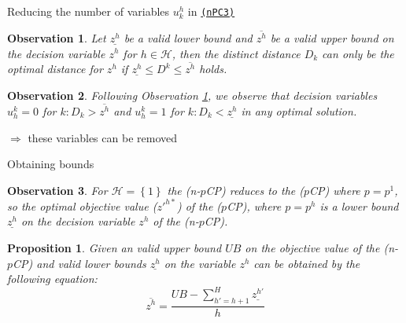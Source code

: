 \documentclass[utf8,aspectratio=1610,ngerman,english]{beamer}
\newtheorem{observation}{Observation}
\newtheorem{proposition}{Proposition}
\newcommand{\nPCE}{\hyperref[eq:nPCE]{\texttt{(nPC3)}}\xspace}
\newcommand{\pCP}{($p$CP)\xspace}
\newcommand{\npCP}{(n-$p$CP)\xspace}
\begin{document}
\begin{frame}{Reducing the number of variables $u_k^h$ in \nPCE} \pause
    \begin{observation}\label{obs:bounds}
        \vspace{-8pt}
        Let $\underline{z^h}$ be a valid lower bound and $\overline{z^h}$ be a valid upper bound on the decision variable $z^h$ for $h \in \mathcal H$, then
        the distinct distance $D_k$ can only be the optimal distance for $z^h$ if $\underline{z^h} \leq D^k \leq \overline{z^h}$ holds.
    \end{observation}
    \begin{observation}\label{obs:setVariables}
        \vspace{-8pt}
        Following Observation \ref{obs:bounds}, we observe that decision variables $u_h^k = 0$ for $k: D_k > \overline{z^h}$ and $u_h^k = 1$ for $k: D_k < \underline{z^h}$ in any optimal solution.
    \end{observation}
    $\Longrightarrow $ these variables can be removed
\end{frame}

\begin{frame}{Obtaining bounds} \pause
    \begin{observation}
        For $\mathcal{H} = \left\{1\right\}$ the \npCP reduces to the \pCP where $p = p^1$, so the optimal objective value (${z'}^{h*}$) of the \pCP, where $p = p^h$ is a lower bound $\underline{z^h}$
        on the decision variable $z^h$ of the \npCP.
    \end{observation}\pause
    \begin{proposition}
        Given an valid upper bound $UB$ on the objective value of the \npCP and valid lower bounds $\underline{z^h}$ on the variable $z^h$ can be obtained by the following equation:
        \begin{equation}
            \overline{z^h} = \frac{UB - \sum_{{h'} = h+1}^{H}\underline{z^{h'}}}{h}
        \end{equation}
    \end{proposition} %
\end{frame}
\end{document}
